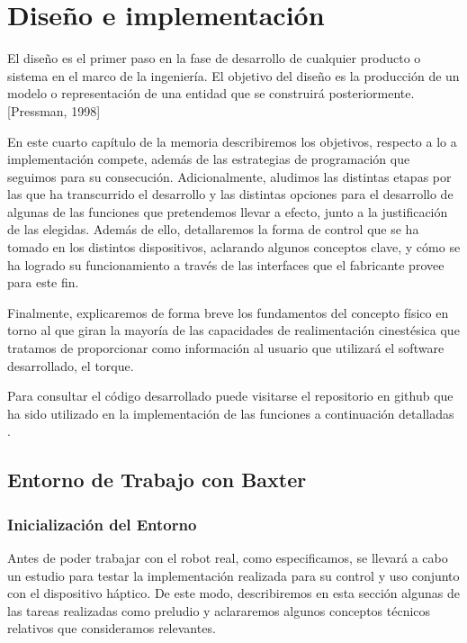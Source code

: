 \chapter{Diseño e implementación}
El diseño es el primer paso en la fase de desarrollo de cualquier producto o sistema en el marco de la ingeniería. El objetivo del diseño es la producción de un modelo o representación de una entidad que se construirá posteriormente. [Pressman, 1998]

En este cuarto capítulo de la memoria describiremos los objetivos, respecto a lo a implementación compete, además de las estrategias de programación que seguimos para su consecución. Adicionalmente, aludimos las distintas etapas por las que ha transcurrido el desarrollo y las distintas opciones para el desarrollo de algunas de las funciones que pretendemos llevar a efecto, junto a la justificación de las elegidas. Además de ello, detallaremos la forma de control que se ha tomado en los distintos dispositivos, aclarando algunos conceptos clave, y cómo se ha logrado su funcionamiento a través de las interfaces que el fabricante provee para este fin.

Finalmente, explicaremos de forma breve los fundamentos del concepto físico en torno al que giran la mayoría de las capacidades de realimentación cinestésica que tratamos de proporcionar como información al usuario que utilizará el software desarrollado, el torque. 

Para consultar el código desarrollado puede visitarse el repositorio en github que ha sido utilizado en la implementación de las funciones a continuación detalladas \cite{93}. 

\bigskip
\bigskip
\bigskip
\bigskip
\bigskip
\bigskip
\bigskip
\bigskip


\section{Entorno de Trabajo con Baxter}

\subsection{Inicialización del Entorno}
Antes de poder trabajar con el robot real, como especificamos, se llevará a cabo un estudio para testar la implementación realizada para su control y uso conjunto con el dispositivo háptico. De este modo, describiremos en esta sección algunas de las tareas realizadas como preludio y aclararemos algunos conceptos técnicos relativos que consideramos relevantes.

